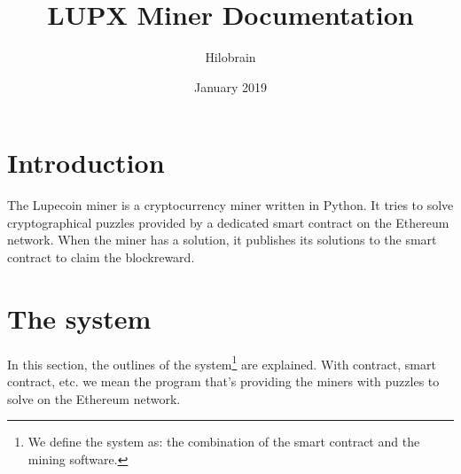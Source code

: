 \documentclass{article}
\title{LUPX Miner Documentation}
\author{Hilobrain}
\date{January 2019}
\begin{document}
\maketitle

\section{Introduction}
The Lupecoin miner is a cryptocurrency miner written in Python. It tries to solve cryptographical puzzles provided by a dedicated smart contract on the Ethereum network. When the miner has a solution, it publishes its solutions to the smart contract to claim the blockreward. 

\section{The system}
In this section, the outlines of the system\footnote{We define the system as: the combination of the smart contract and the mining software.} are explained. With contract, smart contract, etc. we mean the program that's providing the miners with puzzles to solve on the Ethereum network.
\end{document}

